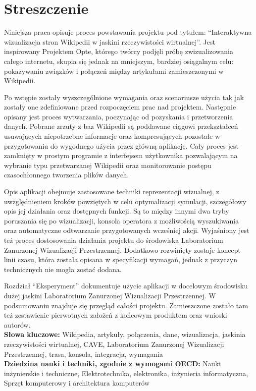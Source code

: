 \chapter*{Streszczenie}
Niniejsza praca opisuje proces powstawania projektu pod tytułem: ``Interaktywna wizualizacja stron Wikipedii w jaskini rzeczywistości wirtualnej''. Jest inspirowany Projektem Opte, którego twórcy podjęli próbę zwizualizowania całego internetu, skupia się jednak na mniejszym, bardziej osiągalnym celu: pokazywaniu związków i połączeń między artykułami zamieszczonymi w Wikipedii. 

Po wstępie zostały wyszczególnione wymagania oraz scenariusze użycia tak jak zostały one zdefiniowane przed rozpoczęciem prac nad projektem. Następnie opisany jest proces wytwarzania, poczynając od pozyskania i przetworzenia danych. Pobrane zrzuty z baz Wikipedii są poddawane ciągowi przekształceń usuwających niepotrzebne informacje oraz kompresujących pozostałe w przygotowaniu do wygodnego użycia przez główną aplikację. Cały proces jest zamknięty w prostym programie z interfejsem użytkownika pozwalającym na wybranie typu przetwarzanej Wikipedii oraz monitorowanie postępu czasochłonnego tworzenia plików danych.

Opis aplikacji obejmuje zastosowane techniki reprezentacji wizualnej, z uwzględnieniem kroków powziętych w celu optymalizacji symulacji, szczegółowy opis jej działania oraz dostępnych funkcji. Są to między innymi dwa tryby poruszania się po wizualizacji, konsola operatora z możliwością wyszukiwania oraz automatyczne odtwarzanie przygotowanych wcześniej akcji. Wyjaśniony jest też proces dostosowania działania projektu do środowiska Laboratorium Zanurzonej Wizualizacji Przestrzennej. Dodatkowo rozwinięty zostaje koncept linii czasu, która została opisana w specyfikacji wymagań, jednak z przyczyn technicznych nie mogła zostać dodana.

Rozdział ``Eksperyment'' dokumentuje użycie aplikacji w docelowym środowisku dużej jaskini Laboratorium Zanurzonej Wizualizacji Przestrzennej. W podsumowaniu znajduje się przegląd całości projektu. Zamieszczone zostało tam też zestawienie pierwotnych założeń z końcowym produktem oraz wnioski autorów.\\

\noindent\textbf{Słowa kluczowe:} Wikipedia, artykuły, połączenia, dane, wizualizacja, jaskinia rzeczywistości wirtualnej, CAVE, Laboratorium Zanurzonej Wizualizacji Przestrzennej, trasa, konsola, integracja, wymagania \\

\noindent\textbf{Dziedzina nauki i techniki, zgodnie z wymogami OECD:} Nauki inżynierskie i techniczne, Elektrotechnika, elektronika, inżynieria informatyczna, Sprzęt komputerowy i architektura komputerów
